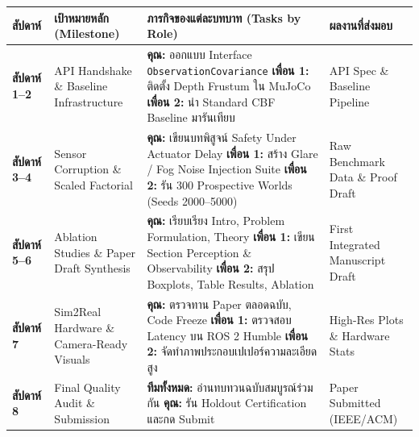 \documentclass[10pt,a4paper]{article}
\begin{document}
\begin{center}
\footnotesize
\begin{tabularx}{\textwidth}{>{\centering\arraybackslash}p{1.4cm} >{\raggedright\arraybackslash}p{3.8cm} >{\raggedright\arraybackslash}X >{\centering\arraybackslash}p{2.6cm}}
\toprule
\textbf{สัปดาห์} & \textbf{เป้าหมายหลัก (Milestone)} & \textbf{ภารกิจของแต่ละบทบาท (Tasks by Role)} & \textbf{ผลงานที่ส่งมอบ} \\
\midrule
\textbf{สัปดาห์ 1--2} & API Handshake \& Baseline Infrastructure & \textbf{คุณ:} ออกแบบ Interface \texttt{ObservationCovariance} \newline \textbf{เพื่อน 1:} ติดตั้ง Depth Frustum ใน MuJoCo \newline \textbf{เพื่อน 2:} นำ Standard CBF Baseline มารันเทียบ & API Spec \& Baseline Pipeline \\
\midrule
\textbf{สัปดาห์ 3--4} & Sensor Corruption \& Scaled Factorial & \textbf{คุณ:} เขียนบทพิสูจน์ Safety Under Actuator Delay \newline \textbf{เพื่อน 1:} สร้าง Glare / Fog Noise Injection Suite \newline \textbf{เพื่อน 2:} รัน 300 Prospective Worlds (Seeds 2000--5000) & Raw Benchmark Data \& Proof Draft \\
\midrule
\textbf{สัปดาห์ 5--6} & Ablation Studies \& Paper Draft Synthesis & \textbf{คุณ:} เรียบเรียง Intro, Problem Formulation, Theory \newline \textbf{เพื่อน 1:} เขียน Section Perception \& Observability \newline \textbf{เพื่อน 2:} สรุป Boxplots, Table Results, Ablation & First Integrated Manuscript Draft \\
\midrule
\textbf{สัปดาห์ 7} & Sim2Real Hardware \& Camera-Ready Visuals & \textbf{คุณ:} ตรวจทาน Paper ตลอดฉบับ, Code Freeze \newline \textbf{เพื่อน 1:} ตรวจสอบ Latency บน ROS 2 Humble \newline \textbf{เพื่อน 2:} จัดทำภาพประกอบเปเปอร์ความละเอียดสูง & High-Res Plots \& Hardware Stats \\
\midrule
\textbf{สัปดาห์ 8} & Final Quality Audit \& Submission & \textbf{ทีมทั้งหมด:} อ่านทบทวนฉบับสมบูรณ์ร่วมกัน \newline \textbf{คุณ:} รัน Holdout Certification และกด Submit & Paper Submitted (IEEE/ACM) \\
\bottomrule
\end{tabularx}
\end{center}

\vspace{12pt}
\end{document}
